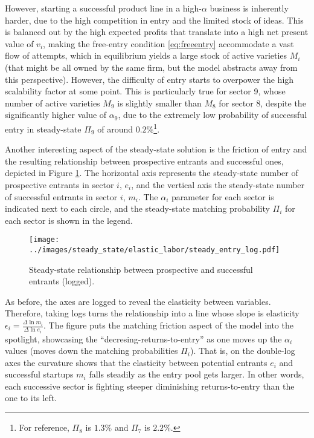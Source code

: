\documentclass[a4paper,12pt]{article} %
\numberwithin{equation}{section} %
\numberwithin{figure}{section}
\numberwithin{table}{section}
\begin{document}
However, starting a successful product line in a high-$\alpha$ business is inherently harder, due to the high competition in entry and the 
limited stock of ideas. This is balanced out by the high expected profits that translate into a high net present value of $v_i$,
making the free-entry condition \eqref{eq:freeentry} accommodate a vast flow of attempts, which in equilibrium yields a large stock
of active varieties $M_i$ (that might be all owned by the same firm, but the model abstracts away from this perspective). However, the difficulty of
entry starts to overpower the high scalability factor at some point. This is particularly true for sector 9, whose number of active varieties $M_9$ is slightly
smaller than $M_8$ for sector 8, despite the significantly higher value of $\alpha_9$, due to the extremely low probability of successful entry in 
steady-state $\Pi_9$ of around $0.2\%$\footnote{For reference, $\Pi_8$ is $1.3\%$ and $\Pi_7$ is $2.2\%$.}.

Another interesting aspect of the steady-state solution is the friction of entry and the resulting relationship 
between prospective entrants and successful ones, depicted in Figure \ref{fig:steady-entry-log}. 
The horizontal axis represents the steady-state number of prospective
entrants in sector $i$, $e_i$, and the vertical axis the steady-state number of successful entrants in sector $i$, $m_i$. The $\alpha_i$
parameter for each sector is indicated next to each circle, and the steady-state matching probability $\Pi_i$ for each sector is shown 
in the legend.

\begin{figure}[H]
  \centering
  \texttt{[image: ../images/steady\_state/elastic\_labor/steady\_entry\_log.pdf]}
  \caption{Steady-state relationship between prospective and successful entrants (logged).}
  \label{fig:steady-entry-log}
\end{figure}
As before, the axes are logged to reveal the elasticity between variables.
Therefore, taking logs turns the relationship into a line whose slope is elasticity $\epsilon_i = \frac{\Delta \ln m_i}{\Delta \ln e_i}$. 
The figure puts the matching friction aspect of the model into the spotlight, showcasing the ``decresing-returns-to-entry''
as one moves up the $\alpha_i$ values (moves down the matching probabilities $\Pi_i$). That is, on the double-log axes the 
curvature shows that the elasticity between potential entrants $e_i$ and successful startups $m_i$ falls steadily as the entry pool 
gets larger. In other words, each successive sector is fighting steeper diminishing returns-to-entry than the one to its left. 
\end{document}
